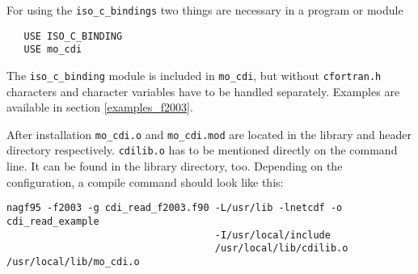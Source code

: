 For using the \texttt{iso\_c\_bindings} two things are necessary in a program or module

\begin{verbatim}
   USE ISO_C_BINDING
   USE mo_cdi
\end{verbatim}

The \texttt{iso\_c\_binding} module is included in \texttt{mo\_cdi}, but without
\texttt{cfortran.h} characters and character variables have to be handled separately.
Examples are available in section \ref{examples_f2003}.

After installation \texttt{mo\_cdi.o} and \texttt{mo\_cdi.mod} are located in the
library and header directory respectively. \texttt{cdilib.o} has to be
mentioned directly on the command line. It can be found in the
library directory, too. Depending on the {\CDI} configuration, a compile command
should look like this:

\begin{verbatim}
nagf95 -f2003 -g cdi_read_f2003.f90 -L/usr/lib -lnetcdf -o cdi_read_example 
                                    -I/usr/local/include 
                                    /usr/local/lib/cdilib.o /usr/local/lib/mo_cdi.o
\end{verbatim}



